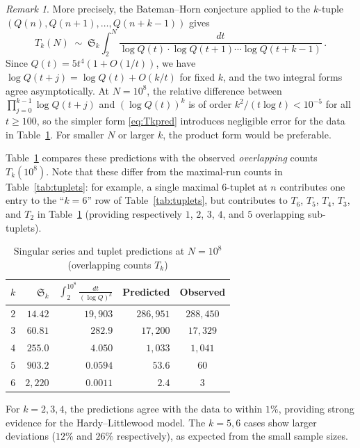 \documentclass[11pt,a4paper]{article}
\theoremstyle{plain}
\theoremstyle{definition}
\theoremstyle{remark}
\newtheorem{remark}[theorem]{Remark}
\begin{document}
\begin{remark}\label{rem:logproduct}
More precisely, the Bateman--Horn conjecture applied to the $k$-tuple $(Q(n), Q(n{+}1), \ldots, Q(n{+}k{-}1))$ gives
\[
T_k(N) \;\sim\; \mathfrak{S}_k \int_2^N \frac{dt}{\log Q(t) \cdot \log Q(t{+}1) \cdots \log Q(t{+}k{-}1)}\,.
\]
Since $Q(t) = 5t^4(1 + O(1/t))$, we have $\log Q(t+j) = \log Q(t) + O(k/t)$ for fixed $k$, and the two integral forms agree asymptotically. At $N = 10^8$, the relative difference between $\prod_{j=0}^{k-1}\log Q(t+j)$ and $(\log Q(t))^k$ is of order $k^2/(t\log t) < 10^{-5}$ for all $t \ge 100$, so the simpler form \eqref{eq:Tkpred} introduces negligible error for the data in Table~\ref{tab:Sk}. For smaller $N$ or larger $k$, the product form would be preferable.
\end{remark}

Table~\ref{tab:Sk} compares these predictions with the observed \emph{overlapping} counts $T_k(10^8)$. Note that these differ from the maximal-run counts in Table~\ref{tab:tuplets}: for example, a single maximal $6$-tuplet at $n$ contributes one entry to the ``$k=6$'' row of Table~\ref{tab:tuplets}, but contributes to $T_6$, $T_5$, $T_4$, $T_3$, and $T_2$ in Table~\ref{tab:Sk} (providing respectively $1$, $2$, $3$, $4$, and $5$ overlapping sub-tuplets).

\begin{table}[ht]
\centering
\caption{Singular series and tuplet predictions at $N = 10^8$ (overlapping counts $T_k$)}
\label{tab:Sk}
\smallskip
\begin{tabular}{@{}rrrrc@{}}
\toprule
$k$ & $\mathfrak{S}_k$ & $\displaystyle\int_2^{10^8}\!\frac{dt}{(\log Q)^k}$ & Predicted & Observed \\
\midrule
$2$ & $14.42$ & $19{,}903$ & $286{,}951$ & $288{,}450$ \\
$3$ & $60.81$ & $282.9$ & $17{,}200$  & $17{,}329$ \\
$4$ & $255.0$ & $4.050$ & $1{,}033$  & $1{,}041$ \\
$5$ & $903.2$ & $0.0594$ & $53.6$     & $60$ \\
$6$ & $2{,}220$ & $0.0011$ & $2.4$     & $3$ \\
\bottomrule
\end{tabular}
\end{table}

For $k = 2, 3, 4$, the predictions agree with the data to within $1\%$, providing strong evidence for the Hardy--Littlewood model. The $k = 5, 6$ cases show larger deviations ($12\%$ and $26\%$ respectively), as expected from the small sample sizes.
\end{document}

